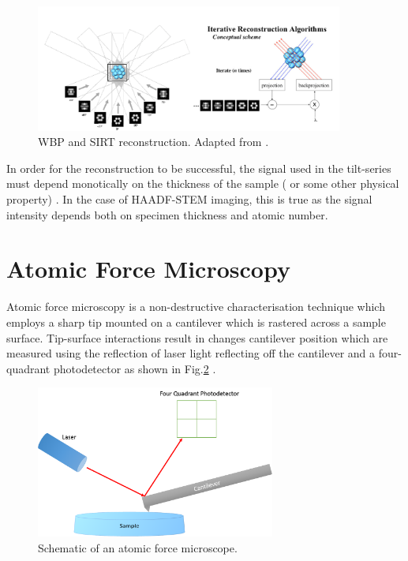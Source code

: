 \begin{figure}[h]
	\centering
	\includegraphics[width=0.9\textwidth]{Figs/Ch2/WBPSIRT.png}
	\caption {WBP and SIRT reconstruction. Adapted from \cite{Fernandez2010}.}
	\label{WBPSIRT}
\end{figure}
\FloatBarrier


In order for the reconstruction to be successful, the signal used in the tilt-series must depend monotically on the thickness of the sample ( or some other physical property) \cite{Frank2006}. In the case of HAADF-STEM imaging, this is true as the signal intensity depends both on specimen thickness and atomic number.	


\section{Atomic Force Microscopy}
Atomic force microscopy   is a non-destructive characterisation technique which employs a sharp tip mounted on a cantilever which is rastered across a sample surface. Tip-surface interactions result in changes cantilever position which are measured using the reflection of laser light reflecting off the cantilever and a four-quadrant photodetector as shown in Fig.\ref{2.1} \cite{Oliver2008}.

\begin{figure}[h]
	\centering
	\includegraphics[width=0.7\textwidth]{Figs/Ch2/AFM.png}
	\caption {Schematic of an atomic force microscope.}
	\label{2.1}
\end{figure}
\FloatBarrier


